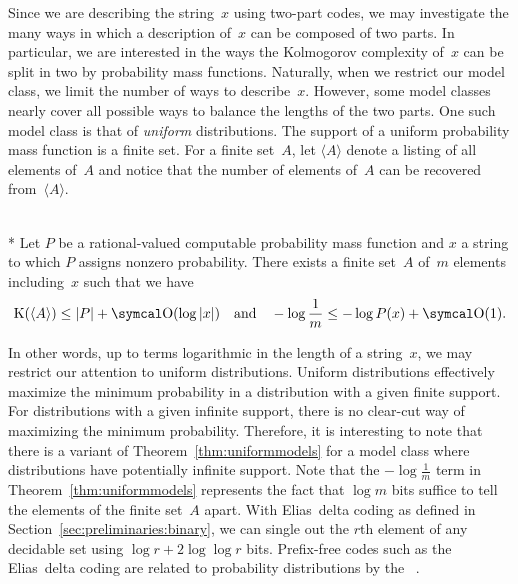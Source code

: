 Since we are describing the string~$x$ using two-part codes, we may investigate the many ways in which a description of~$x$ can be composed of two parts.
In particular, we are interested in the ways the Kolmogorov complexity of~$x$ can be split in two by probability mass functions.
Naturally, when we restrict our model class, we limit the number of ways to describe~$x$.
However, some model classes nearly cover all possible ways to balance the lengths of the two parts.
One such model class is that of \emph{uniform} distributions.
The support of a uniform probability mass function is a finite set.
For a finite set~$A$, let $\langle A\rangle$ denote a listing of all elements of~$A$ and notice that the number of elements of~$A$ can be recovered from~$\langle A\rangle$.
\begin{theorem}\hspace{0pt}\\*
\label{thm:uniformmodels}%
  Let $P$ be a rational-valued computable probability mass function and $x$ a string to which $P$ assigns nonzero probability.
  There exists a finite set~$A$ of~$m$ elements including~$x$ such that we have
  \begin{equation*}
    \KC(\langle A\rangle) \le \length{P} + \bigO(\log \length{x}) \quad\text{and}\quad -\log \frac{1}{m} \le -\log P(x) + \bigO(1).
  \end{equation*}
\end{theorem}
In other words, up to terms logarithmic in the length of a string~$x$, we may restrict our attention to uniform distributions.
Uniform distributions effectively maximize the minimum probability in a distribution with a given finite support.
For distributions with a given infinite support, there is no clear-cut way of maximizing the minimum probability.
Therefore, it is interesting to note that there is a variant of Theorem~\ref{thm:uniformmodels} for a model class where distributions have potentially infinite support.
Note that the $-\log \frac{1}{m}$ term in Theorem~\ref{thm:uniformmodels} represents the fact that $\log m$ bits suffice to tell the elements of the finite set~$A$ apart.
With Elias~delta coding as defined in Section~\ref{sec:preliminaries:binary}, we can single out the $r$th element of any decidable set using $\log r + 2 \log \log r$ bits.
Prefix-free codes such as the Elias~delta coding are related to probability distributions by the ~\parencite{cover2006elements,li2008introduction}.
